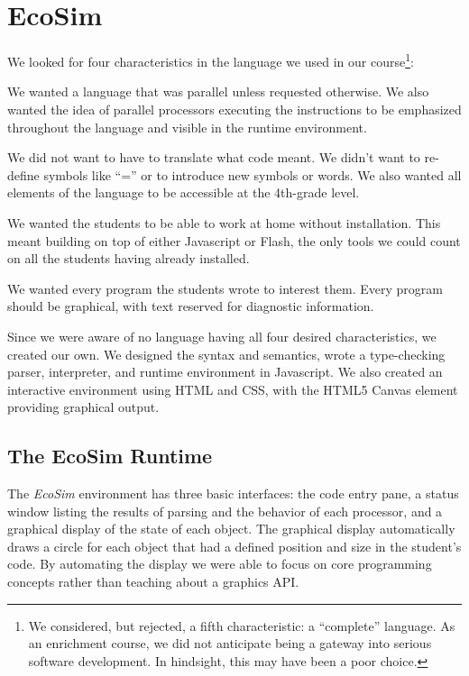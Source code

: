 \documentclass{sig-alternate}
\newcommand{\EcoSim}{\emph{EcoSim}}
\begin{document}
\section{EcoSim}
We looked for four characteristics in the language we used in our course\footnote{
We considered, but rejected, a fifth characteristic: a ``complete'' language.
As an enrichment course, we did not anticipate being a gateway into serious software development.
In hindsight, this may have been a poor choice.
}:
\begin{description}\itemsep=0pt
	\item[Visibly Parallel:]
		We wanted a language that was parallel unless requested otherwise.
		We also wanted the idea of parallel processors executing the instructions
		to be emphasized throughout the language and visible in the runtime environment.
	\item[Self-Explanatory:]
		We did not want to have to translate what code meant.
		We didn't want to re-define symbols like ``='' or to introduce new symbols or words.
		We also wanted all elements of the language to be accessible at the 4th-grade level.
	\item[Web-Based:]
		We wanted the students to be able to work at home without installation.
		This meant building on top of either Javascript or Flash, 
		the only tools we could count on all the students having already installed.
	\item[Engaging:]
		We wanted every program the students wrote to interest them.
		Every program should be graphical, with text reserved for diagnostic information.
\end{description}

Since we were aware of no language having all four desired characteristics, 
we created our own.
We designed the syntax and semantics, 
wrote a type-checking parser, interpreter, and runtime environment in Javascript.
We also created an interactive environment using HTML and CSS, with the HTML5 Canvas element providing graphical output.

\subsection{The EcoSim Runtime}\label{sec:runtime}
The \EcoSim{} environment has three basic interfaces:
the code entry pane, 
a status window listing the results of parsing and the behavior of each processor,
and a graphical display of the state of each object.
The graphical display automatically draws a circle for each object
that had a defined position and size in the student's code.
By automating the display 
we were able to focus on core programming concepts
rather than teaching about a graphics API.
\end{document}
